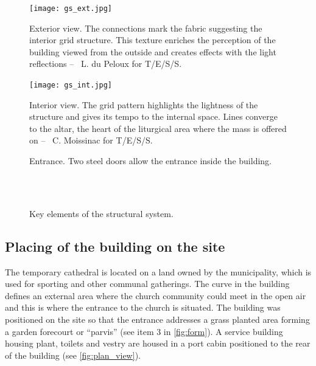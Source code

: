 \begin{figure}[p]
     	\centering
	\begin{leftfullpage}	
		\texttt{[image: gs\_ext.jpg]}
		\caption[Exterior view]{Exterior view. The connections mark the fabric suggesting the interior grid structure. This texture enriches the perception of the building viewed from the outside and creates effects with the light reflections -- \textcopyright~L. du Peloux for T/E/S/S.}
		\label{fig:gs_ext}
		\vspace{1cm}
		\texttt{[image: gs\_int.jpg]}\label{fig:gs_int}
		\caption[Interior view]{Interior view. The grid pattern highlights the lightness of the structure and gives its tempo to the internal space. Lines converge to the altar, the heart of the liturgical area where the mass is offered on -- \textcopyright~C. Moissinac for T/E/S/S.}
		\vspace{20pt}
	\end{leftfullpage}
\end{figure}

\begin{figure}[p]
     	\centering
	\begin{fullpage}	
		\hspace*{\fill}
		\vspace{10pt}
		\caption[Entrance]{Entrance. Two steel doors allow the entrance inside the building.}
		\label{fig:door}
     		\vspace{1cm}
		\hspace*{\fill}
		 \\
		\hspace*{\fill}
		 \\
		\vspace{10pt}
		\caption[Key elements of the structural system]{Key elements of the structural system.}
		\label{fig:parts}    
	\end{fullpage}
\end{figure}

\subsection{Placing of the building on the site}
The temporary cathedral is located on a land owned by the municipality, which is used for sporting and other communal gatherings. The curve in the building defines an external area where the church community could meet in the open air and this is where the entrance to the church is situated. The building was positioned on the site so that the entrance addresses a grass planted area forming a garden forecourt or “parvis” (see item 3 in \cref{fig:form}). A service building housing plant, toilets and vestry are housed in a port cabin positioned to the rear of the building (see \cref{fig:plan_view}).


